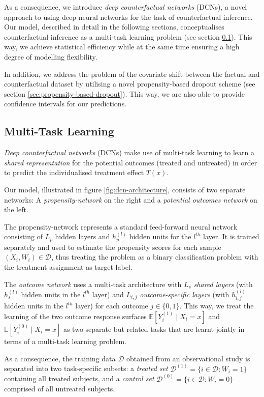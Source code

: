 As a consequence, we introduce \emph{deep counterfactual networks} (DCNs), a novel approach to using deep neural networks for the task of counterfactual inference. Our model, described in detail in the following sections, conceptualises counterfactual inference as a multi-task learning problem (see section \ref{sec:multi-task-learning}). This way, we achieve  statistical efficiency while at the same time ensuring a high degree of modelling flexibility. 

In addition, we address the  problem of the covariate shift between the factual and counterfactual dataset by utilising a novel propensity-based dropout scheme (see section \ref{sec:propensity-based-dropout}). This way, we are also able to provide confidence intervals for our predictions. 

\subsection{Multi-Task Learning} \label{sec:multi-task-learning}
\emph{Deep counterfactual networks} (DCNs) make use of multi-task learning to learn a \emph{shared representation} for the potential outcomes (treated and untreated) in order to predict the individualised treatment effect $T(x)$. 

Our model, illustrated in figure \ref{fig:dcn-architecture}, consists of two separate networks: A \emph{propensity-network} on the right and a \emph{potential outcomes network} on the left.

The propensity-network represents a standard feed-forward neural network consisting of $L_p$ hidden layers and $h_p^{(l)}$ hidden units for the $l^{th}$ layer. It is trained separately and used to estimate the propensity scores for each sample $(X_i, W_i) \in \mathcal{D}$, thus treating the problem as a binary classification problem with the treatment assignment as target label. 

The \emph{outcome network} uses a multi-task architecture %
with $L_s$ \emph{shared layers} (with $h_s^{(l)}$ hidden units in the $l^{th}$ layer) and $L_{i,j}$ \emph{outcome-specific layers} (with $h_{i,j}^{(l)}$ hidden units in the $l^{th}$ layer) for each outcome $j \in \{0,1\}$. This way, we treat the learning of the two outcome response surfaces $\mathbb{E}[Y_i^{(1)} \mid X_i = x]$ and $\mathbb{E}[Y_i^{(0)} \mid X_i = x]$ as two separate but related tasks that are learnt jointly in terms of a multi-task learning problem.

As a consequence, the training data $\mathcal{D}$ obtained from an observational study is separated into two task-specific subsets: a \emph{treated set} $\mathcal{D}^{(1)} = \{i \in \mathcal{D} : W_i = 1\}$ containing all treated subjects, and a \emph{control set} $\mathcal{D}^{(0)} = \{i \in \mathcal{D} : W_i = 0\}$ comprised of all untreated subjects. 

